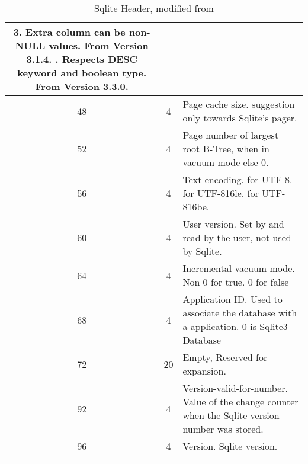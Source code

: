 \begin{longtable}[h]{| c | c | p{10cm} |}
			3. Extra column can be non-NULL values. From Version 3.1.4. \newline
			4. Respects DESC keyword and boolean type. From Version 3.3.0. \newline \\
		\hline
			48 & 4 & Page cache size. suggestion only towards Sqlite's pager. \\
		\hline
			52 & 4 & Page number of largest root B-Tree, when in vacuum mode else 0. \\
		\hline
			56 & 4 & Text encoding. \newline
			 1 for UTF-8. \newline 
			 2 for UTF-816le. \newline 
			 3 for UTF-816be. \\
		\hline
			60 & 4 & User version. Set by and read by the user, not used by Sqlite. \\
		\hline
			64 & 4 & Incremental-vacuum mode. Non 0 for true. 0 for false \\
		\hline
			68 & 4 & Application ID. Used to associate the database with a application. 0 is Sqlite3 Database \\
		\hline
			72 & 20 & Empty, Reserved for expansion. \\
		\hline
			92 & 4 & Version-valid-for-number. Value of the change counter when the Sqlite version number was stored. \\
		\hline
			96 & 4 & Version. Sqlite version. \\
		\hline
	\caption{Sqlite Header, modified from \cite{sqlite}}
	\label{tbl:sqlite_header}
\end{longtable}
